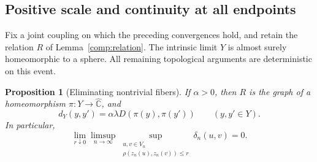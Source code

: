 \documentclass[11pt]{article}
\numberwithin{equation}{section}
\newtheorem{proposition}[theorem]{Proposition}
\theoremstyle{definition}
\theoremstyle{remark}
\newcommand{\1}{\mathbf 1}
\begin{document}
\subsection{Positive scale and continuity at all endpoints}

Fix a joint coupling on which the preceding convergences hold, and
retain the relation $R$ of Lemma~\ref{comp:relation}.  The intrinsic
limit $Y$ is almost surely homeomorphic to a sphere.  All remaining
topological arguments are deterministic on this event.

\begin{proposition}[Eliminating nontrivial fibers]
\label{comp:positive-fibers}
If $\alpha>0$, then $R$ is the graph of a homeomorphism
$\pi:Y\to\widehat{\mathbb C}$, and
\begin{equation}
 \label{comp:proportionality}
 d_Y(y,y')=\alpha\lambda D(\pi(y),\pi(y'))
 \qquad(y,y'\in Y).
\end{equation}
In particular,
\begin{equation}
 \label{comp:endpoint-modulus}
 \lim_{r\downarrow0}\limsup_{n\to\infty}
 \sup_{\substack{u,v\in V_n\\\rho(z_n(u),z_n(v))\le r}}
 \delta_n(u,v)=0.
\end{equation}
\end{proposition}
\end{document}
